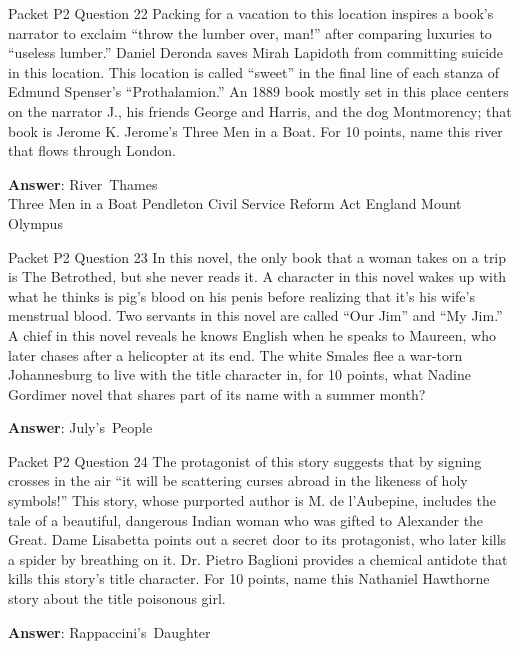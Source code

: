 \begin{frame}{Packet P2 Question 22}
Packing for a vacation to this location inspires a book’s narrator to exclaim “throw the lumber over, man!” after comparing luxuries to “useless lumber.” Daniel Deronda saves Mirah Lapidoth from committing suicide in this location. This location is called ``sweet'' in the final line of each stanza of Edmund Spenser's ``Prothalamion.'' An 1889 book mostly set in this place centers on the narrator J., his friends George and Harris, and the dog Montmorency; that book is Jerome K. Jerome’s Three Men in a Boat. For 10 points, name this river that flows through London.        

\textbf{Answer}: River\ Thames\\
 Three Men in a Boat
 Pendleton Civil Service Reform Act
 England
 Mount Olympus
\end{frame}

\begin{frame}{Packet P2 Question 23}
In this novel, the only book that a woman takes on a trip is The Betrothed, but she never reads it. A character in this novel wakes up with what he thinks is pig’s blood on his penis before realizing that   it’s his wife’s menstrual blood. Two servants in this novel are called “Our Jim” and “My Jim.” A chief in this novel reveals he knows English when he speaks to Maureen, who later   chases after a helicopter at its end. The white Smales flee a war-torn Johannesburg to live with the   title character in, for 10 points, what Nadine Gordimer novel   that shares part of its name with a summer month?

\textbf{Answer}: July's\ People\\
\end{frame}

\begin{frame}{Packet P2 Question 24}
The protagonist of this story suggests that by signing crosses in the air “it will be scattering curses abroad in the likeness of holy symbols!” This story, whose purported author is M. de l'Aubepine, includes the tale of a beautiful, dangerous Indian woman who was gifted to Alexander the Great. Dame Lisabetta points out   a secret door to its protagonist, who later kills a spider   by breathing on it. Dr. Pietro Baglioni     provides a chemical antidote that kills this story’s title character. For 10 points, name this Nathaniel Hawthorne story about the title poisonous girl.

\textbf{Answer}: Rappaccini's\ Daughter\\
\end{frame}

